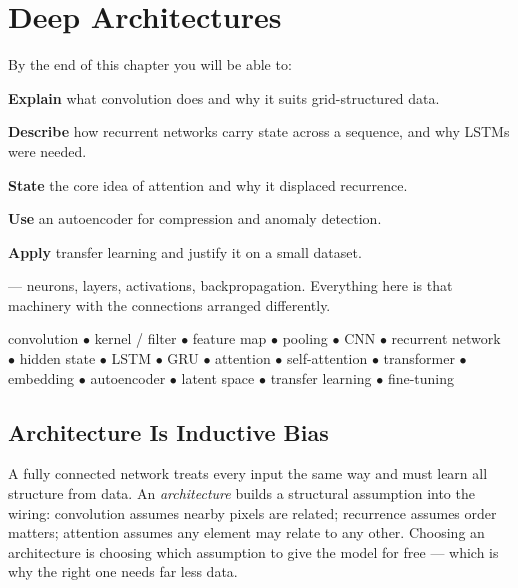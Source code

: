 \chapter{Deep Architectures}\label{ch:architectures}

\begin{outcomes}
By the end of this chapter you will be able to:
\begin{tight}
  \item \textbf{Explain} what convolution does and why it suits grid-structured data.
  \item \textbf{Describe} how recurrent networks carry state across a sequence, and why LSTMs were needed.
  \item \textbf{State} the core idea of attention and why it displaced recurrence.
  \item \textbf{Use} an autoencoder for compression and anomaly detection.
  \item \textbf{Apply} transfer learning and justify it on a small dataset.
\end{tight}
\end{outcomes}

\begin{prereq}
 --- neurons, layers, activations, backpropagation. Everything
here is that machinery with the connections arranged differently.
\end{prereq}

\begin{keyterms}
convolution $\bullet$ kernel / filter $\bullet$ feature map $\bullet$ pooling
$\bullet$ CNN $\bullet$ recurrent network $\bullet$ hidden state $\bullet$ LSTM
$\bullet$ GRU $\bullet$ attention $\bullet$ self-attention $\bullet$ transformer
$\bullet$ embedding $\bullet$ autoencoder $\bullet$ latent space $\bullet$ transfer
learning $\bullet$ fine-tuning
\end{keyterms}

\section{Architecture Is Inductive Bias}

\begin{conceptbox}
A fully connected network treats every input the same way and must learn all
structure from data. An \emph{architecture} builds a structural assumption into the
wiring: convolution assumes nearby pixels are related; recurrence assumes order
matters; attention assumes any element may relate to any other. Choosing an
architecture is choosing which assumption to give the model for free --- which is
why the right one needs far less data.
\end{conceptbox}

